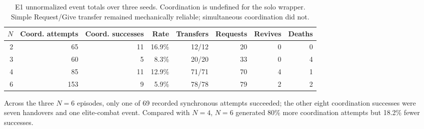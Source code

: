 \documentclass[11pt]{article}
\begin{document}
\begin{table}[ht]
\centering
\small
\begin{tabular}{@{}rrrrrrrr@{}}
\toprule
$N$ & Coord. attempts & Coord. successes & Rate & Transfers & Requests &
Revives & Deaths\\
\midrule
2 & 65  & 11 & 16.9\% & 12/12 & 20 & 0 & 0\\
3 & 60  & 5  & 8.3\%  & 20/20 & 33 & 0 & 4\\
4 & 85  & 11 & 12.9\% & 71/71 & 70 & 4 & 1\\
6 & 153 & 9  & 5.9\%  & 78/78 & 79 & 2 & 2\\
\bottomrule
\end{tabular}
\caption{E1 unnormalized event totals over three seeds.  Coordination is
undefined for the solo wrapper.  Simple Request/Give transfer remained
mechanically reliable; simultaneous coordination did not.}
\label{tab:e1-events}
\end{table}

Across the three $N=6$ episodes, only one of 69 recorded synchronous attempts
succeeded; the other eight coordination successes were seven handovers and one
elite-combat event.
Compared with $N=4$, $N=6$ generated 80\% more coordination attempts but
18.2\% fewer successes.

\begin{table}[ht]
\centering
\small
{}
\caption{Mean E1 cost and execution exposure.  Calls within a tick overlap, so
summed model latency may exceed episode wall time.  Delivered bytes are
ordinary Source broadcast fan-out bytes, not provider traffic.}
\label{tab:e1-cost}
\end{table}
\end{document}
